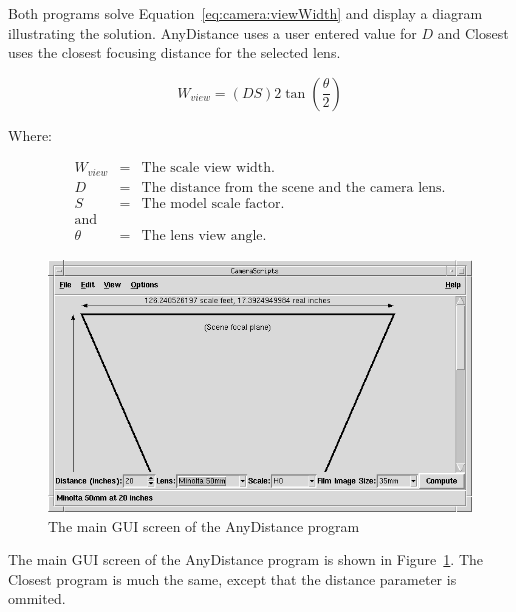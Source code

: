 Both programs solve Equation~\ref{eq:camera:viewWidth} and display a
diagram illustrating the solution.  AnyDistance uses a user entered
value for $D$ and Closest uses the closest focusing distance for the
selected lens.

\begin{equation}
W_{view} = (D S) 2 \tan(\frac{\theta}{2}) \label{eq:camera:viewWidth}
\end{equation}

Where:

\begin{eqnarray*}
W_{view} &=& \mbox{The scale view width.}\\
D &=& \mbox{The distance from the scene and the camera lens.}\\
S &=& \mbox{The model scale factor.}\\
\mbox{and} \\
\theta &=& \mbox{The lens view angle.}
\end{eqnarray*}

\begin{figure}[hbpt]
\begin{centering}
\includegraphics[width=5in]{CameraAnyDist.png}
\caption{The main GUI screen of the AnyDistance program}
\label{fig:camera:anydist}
\end{centering}
\end{figure}
The main GUI screen of the AnyDistance program is shown in
Figure~\ref{fig:camera:anydist}. The Closest program is much the same,
except that the distance parameter is ommited.

